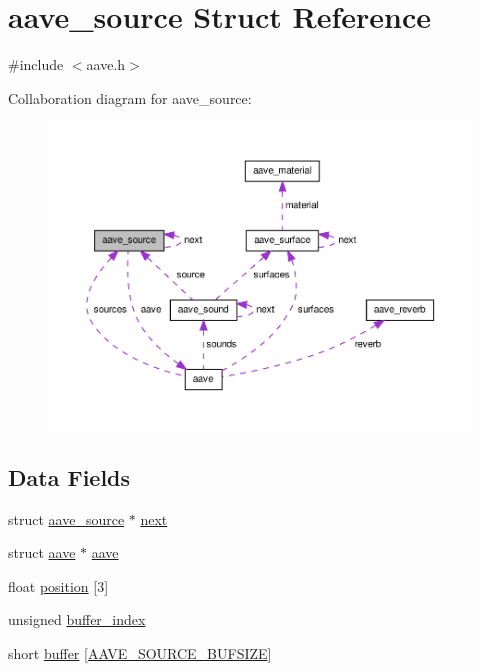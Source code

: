 \hypertarget{structaave__source}{\section{aave\-\_\-source Struct Reference}
\label{structaave__source}
}


{\ttfamily \#include $<$aave.\-h$>$}



Collaboration diagram for aave\-\_\-source\-:\nopagebreak
\begin{figure}[H]
\begin{center}
\leavevmode
\includegraphics[width=350pt]{structaave__source__coll__graph}
\end{center}
\end{figure}
\subsection*{Data Fields}
\begin{DoxyCompactItemize}
\item 
struct \hyperlink{structaave__source}{aave\-\_\-source} $\ast$ \hyperlink{structaave__source_a987a6e5c5f722296854d0d1699fd53fa}{next}
\item 
struct \hyperlink{structaave}{aave} $\ast$ \hyperlink{structaave__source_a5c8d463d1960b8f5c9150f17e31ca230}{aave}
\item 
float \hyperlink{structaave__source_a1c5c2c95f27b846dac60d97cd3d6104e}{position} \mbox{[}3\mbox{]}
\item 
unsigned \hyperlink{structaave__source_a78b8739c3487c7f4cae4529e61063d64}{buffer\-\_\-index}
\item 
short \hyperlink{structaave__source_a25b0c8024c657431c670e52128c429fc}{buffer} \mbox{[}\hyperlink{aave_8h_a0b7b591faf4644c56f374fef7a6141bc}{A\-A\-V\-E\-\_\-\-S\-O\-U\-R\-C\-E\-\_\-\-B\-U\-F\-S\-I\-Z\-E}\mbox{]}
\end{DoxyCompactItemize}


